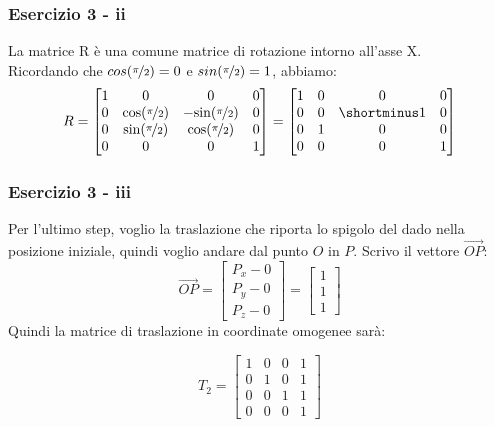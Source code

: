 \documentclass{beamer}
\begin{document}
\begin{frame}
\frametitle{Esercizio 3 - ii}
La matrice R \`e una comune matrice di rotazione intorno all'asse X. \\
Ricordando che $cos(\nicefrac{\pi}{2}) = 0$ e $sin(\nicefrac{\pi}{2}) = 1$, abbiamo:
\begin{displaymath}
R
= 
\begin{bmatrix}
    1 & 0 & 0 & 0 \\
    0 &\mbox{cos}(\nicefrac{\pi}{2}) & -\mbox{sin}(\nicefrac{\pi}{2}) & 0\\
    0 &\mbox{sin}(\nicefrac{\pi}{2}) & \mbox{cos}(\nicefrac{\pi}{2})  & 0\\ 
    0 & 0 & 0 & 1
\end{bmatrix}
= 
\begin{bmatrix}
    1 & 0 & 0 & 0 \\
    0 & 0 & \shortminus 1 & 0\\
    0 & 1 & 0 & 0\\ 
    0 & 0 & 0 & 1
\end{bmatrix}
\end{displaymath}
\end{frame}

\begin{frame}
\frametitle{Esercizio 3 - iii}
Per l'ultimo step, voglio la traslazione che riporta lo spigolo del dado nella posizione
iniziale, quindi voglio andare dal punto $O$ in $P$. Scrivo il vettore $\overrightarrow{OP}$:
\begin{displaymath}
    \overrightarrow{OP}
    = 
\begin{bmatrix}
        P_x - 0\\
        P_y - 0\\
        P_z - 0
\end{bmatrix}
    = 
\begin{bmatrix}
        1\\
        1\\
        1
\end{bmatrix}
\end{displaymath}
Quindi la matrice di traslazione in coordinate omogenee sar\`a:

\begin{displaymath}
T_2 = 
\begin{bmatrix}
        1 & 0 & 0 & 1\\
        0 & 1 & 0 & 1\\
        0 & 0 & 1 & 1\\
        0 & 0 & 0 & 1 
\end{bmatrix}
\end{displaymath}
\end{frame}
\end{document}
